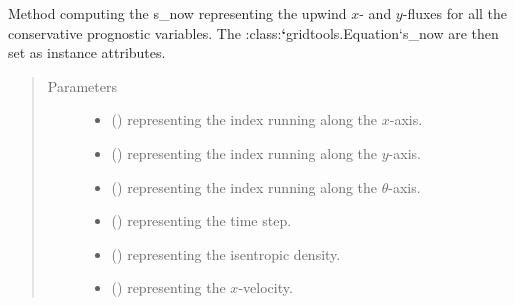 \documentclass[letterpaper,10pt,english]{sphinxmanual}
\begin{document}
\begin{fulllineitems}
\begin{fulllineitems}
\end{fulllineitems}


\begin{fulllineitems}
\label{\detokenize{api:dycore.flux_isentropic_upwind.FluxIsentropicUpwind._compute_horizontal_fluxes}}
Method computing the s\_now representing the upwind \(x\)- and \(y\)-fluxes for all
the conservative prognostic variables. The :class:{\color{red}\bfseries{}{}`}gridtools.Equation{}`s\_now are then set as instance attributes.
\begin{quote}\begin{description}
\item[{Parameters}] \leavevmode\begin{itemize}
\item {} 
 () \textendash{}  representing the index running along the \(x\)-axis.

\item {} 
 () \textendash{}  representing the index running along the \(y\)-axis.

\item {} 
 () \textendash{}  representing the index running along the \(\theta\)-axis.

\item {} 
 () \textendash{}  representing the time step.

\item {} 
 () \textendash{}  representing the isentropic density.

\item {} 
 () \textendash{}  representing the \(x\)-velocity.


\end{itemize}
\end{description}
\end{quote}
\end{fulllineitems}
\end{fulllineitems}
\end{document}
